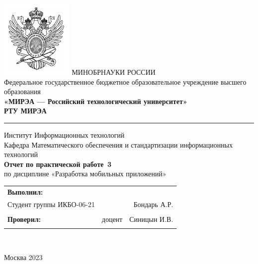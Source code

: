 \begin{center}
	\includegraphics[scale=0.5]{./res/logo} \break %
	\normalsize{МИНОБРНАУКИ РОССИИ}\\
	\normalsize{Федеральное государственное бюджетное образовательное учреждение высшего образования}\\
	\normalsize{\textbf{«МИРЭА --- Российский технологический университет»}}\\
	\large{\textbf{РТУ МИРЭА}}\\
	\bigskip \hrule \smallskip
	\normalsize{Институт Информационных технологий}\\
	\vfill
	\normalsize{Кафедра Математического обеспечения и стандартизации информационных технологий}\\
	\vfill
	\large{\textbf{Отчет по практической работе \No\,3}}\\
	\normalsize{по дисциплине «Разработка мобильных приложений»}\\
	\vfill
	\vfill
	\normalsize{
		\begin{tabular}{lrr}
			\textbf{Выполнил:} & &\\
			Студент группы ИКБО-06-21 & & Бондарь А.Р. \\\\
			\textbf{Проверил:} &  доцент & Синицын И.В. \\\\
		\end{tabular}
	}\\
	\vfill
\end{center}

\begin{center} Москва 2023 \end{center}

\thispagestyle{empty}
